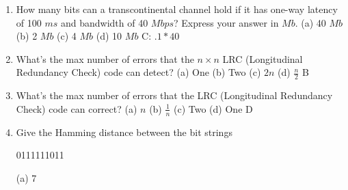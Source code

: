 \documentclass{article}
\begin{document}
\begin{enumerate}
            (a) $2 * 10^{-5} s$
            \newline
            (b) $18 * 10^{-11} s$
            \newline
            (c) $\frac{1}{2} * 10^{-5} s$
            \newline
            (d) $18 * 10^{-5} s$
            \newline
            A: $\frac{6}{3x10^8} = 2 * 10^{-5}$
        \item How many bits can a transcontinental channel hold if it has one-way latency of 100 $ms$ and bandwidth of 40 $Mbps$? Express your answer in $Mb$.
            \newline
            (a) 40 $Mb$
            \newline
            (b) 2 $Mb$
            \newline
            (c) 4 $Mb$
            \newline
            (d) 10 $Mb$
            \newline
            C: $.1 * 40$
        \item What's the max number of errors that the $n \times n$ LRC (Longitudinal Redundancy Check) code can detect?
            \newline
            (a) One
            \newline
            (b) Two
            \newline
            (c) $2n$
            \newline
            (d) $\frac{n}{2}$
            \newline
            B
        \item What's the max number of errors that the LRC (Longitudinal Redundancy Check) code can correct?
            \newline
            (a) $n$
            \newline
            (b) $\frac{1}{n}$
            \newline
            (c) Two
            \newline
            (d) One 
            \newline
            D
        \item Give the Hamming distance between the bit strings
            \begin{center}
                0111111011
            \end{center}
            (a) 7
            \newline

\end{enumerate}
\end{document}

